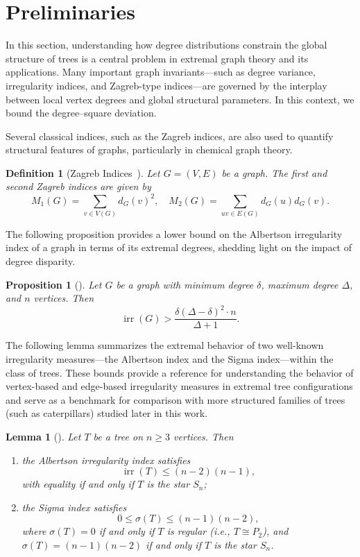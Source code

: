 \documentclass[12pt, a4paper]{article}
\newtheorem{lemma}[theorem]{Lemma}
\newtheorem{proposition}{Proposition}[section]
\newtheorem{definition}{Definition}
\begin{document}
 \section{Preliminaries}\label{sec2}
In this section, understanding how degree distributions constrain the global structure of trees is a central problem in extremal graph theory and its applications. Many important graph invariants---such as degree variance, irregularity indices, and Zagreb-type indices---are governed by the interplay between local vertex degrees and global structural parameters. In this context, we bound the degree--square deviation.

Several classical indices, such as the Zagreb indices, are also used to quantify structural features of graphs, particularly in chemical graph theory.
\begin{definition}[Zagreb Indices~\cite{gutman1972total, gutman1975acyclic}]
Let $ G = (V, E) $ be a graph. The first and second Zagreb indices are given by
\[
M_1(G) = \sum_{v \in V(G)} d_G(v)^2, \quad M_2(G) = \sum_{uv \in E(G)} d_G(u)d_G(v).
\]
\end{definition}
The following proposition provides a lower bound on the Albertson irregularity index of a graph in terms of its extremal degrees, shedding light on the impact of degree disparity.

\begin{proposition}[\cite{dorjsembe2022irregularity}]
Let $G$ be a graph with minimum degree $\delta$, maximum degree $\Delta$, and $n$ vertices. Then
$$
\operatorname{irr}(G) > \frac{\delta(\Delta - \delta)^2 \cdot n}{\Delta + 1}.
$$
\end{proposition}

The following lemma summarizes the extremal behavior of two well-known irregularity measures---the Albertson index and the Sigma index---within the class of trees. These bounds provide a reference for understanding the behavior of vertex-based and edge-based irregularity measures in extremal tree configurations and serve as a benchmark for comparison with more structured families of trees (such as caterpillars) studied later in this work.

\begin{lemma}[\cite{fath2013extremely,gutman2018inverse}]
Let $T$ be a tree on $n \geq 3$ vertices. Then
\begin{enumerate}
\item the Albertson irregularity index satisfies
  $$
  \operatorname{irr}(T) \le (n-2)(n-1),
  $$
  with equality if and only if $T$ is the star $S_n$;

  \item the Sigma index satisfies
  $$
  0 \le \sigma(T) \le (n-1)(n-2),
  $$
  where $\sigma(T) = 0$ if and only if $T$ is regular (i.e., $T \cong P_2$), and $\sigma(T) = (n-1)(n-2)$ if and only if $T$ is the star $S_n$.
\end{enumerate}
\end{lemma}
\end{document}
